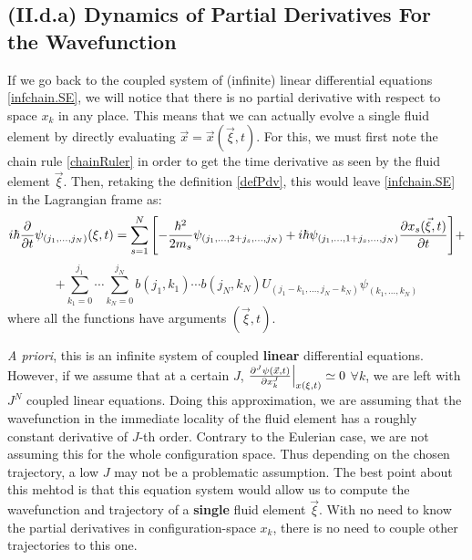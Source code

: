 \documentclass[11pt, a4paper]{article} %
\begin{document}
\subsection*{(II.d.a) Dynamics of Partial Derivatives For the Wavefunction\vspace{-0.1cm}}

If we go back to the coupled system of (infinite) linear differential equations \eqref{infchain.SE}, we will notice that there is no partial derivative with respect to space $x_k$ in any place. This means that we can actually evolve a single fluid element by directly evaluating $\vec{x}=\vec{x}(\vec{\xi},t)$. For this, we must first note the chain rule \eqref{chainRuler} in order to get the time derivative as seen by the fluid element $\vec{\xi}$.
Then, retaking the definition \eqref{defPdv}, this would leave \eqref{infchain.SE} in the Lagrangian frame as:\vspace{-0.1cm}
\begin{equation}\label{infchain.SE.L}
i\hbar \pdv{}{t}\psi_{(j_1,...,j_N)}(\xi,t)=\sum_{s=1}^N\qty[-\frac{\hbar^2}{2m_s}\psi_{(j_1,...,2+j_s,...,j_N)}+i\hbar \psi_{(j_1,...,1+j_s,...,j_N)} \pdv{x_s(\vec{\xi},t)}{t}]+\vspace{-0.1cm}
\end{equation}
$$
+\sum_{k_1=0}^{j_1}\cdots\sum_{k_N=0}^{j_N} b(j_1,k_1)\cdots b(j_N,k_N)U_{(j_1-k_1,...,j_N-k_N)}\psi_{(k_1,...,k_N)}
$$
where all the functions have arguments $(\vec{\xi},t)$.

{\em A priori}, this is an infinite system of coupled {\bf linear} differential equations. However, if we assume that at a certain $J$, $\pdv[J]{\psi(\vec{x},t)}{x_k}\Big\rvert_{x(\xi,t)}\simeq 0$  $\forall k$, we are left with $J^N$ coupled linear equations. Doing this approximation, we are assuming that the wavefunction in the immediate locality of the fluid element has a roughly constant derivative of $J$-th order. Contrary to the Eulerian case, we are not assuming this for the whole configuration space. Thus depending on the chosen trajectory, a low $J$ may not be a problematic assumption. The best point about this mehtod is that this equation system would allow us to compute the wavefunction and trajectory of a {\bf single} fluid element $\vec{\xi}$. With no need to know the partial derivatives in configuration-space $x_k$, there is no need to couple other trajectories to this one.
\end{document}
